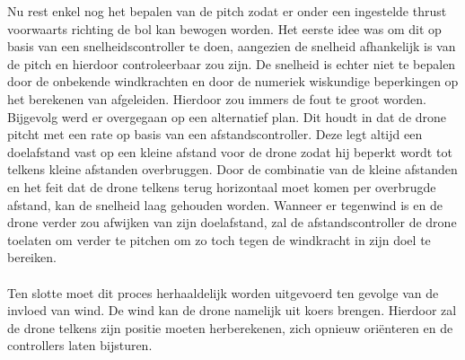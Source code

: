 Nu rest enkel nog het bepalen van de pitch zodat er onder een ingestelde thrust voorwaarts richting de bol kan bewogen worden. Het eerste idee was om dit op basis van een snelheidscontroller te doen, aangezien de snelheid afhankelijk is van de pitch en hierdoor controleerbaar zou zijn. De snelheid is echter niet te bepalen door de onbekende windkrachten en door de numeriek wiskundige beperkingen op het berekenen van afgeleiden. Hierdoor zou immers de fout te groot worden. Bijgevolg werd er overgegaan op een alternatief plan. Dit houdt in dat de drone pitcht met een rate op basis van een afstandscontroller. Deze legt altijd een doelafstand vast op een kleine afstand voor de drone zodat hij beperkt wordt tot telkens kleine afstanden overbruggen. Door de combinatie van de kleine afstanden en het feit dat de drone telkens terug horizontaal moet komen per overbrugde afstand, kan de snelheid laag gehouden worden. Wanneer er tegenwind is en de drone verder zou afwijken van zijn doelafstand, zal de afstandscontroller de drone toelaten om verder te pitchen om zo toch tegen de windkracht in zijn doel te bereiken.
\\
\\
Ten slotte moet dit proces herhaaldelijk worden uitgevoerd ten gevolge van de invloed van wind. De wind kan de drone namelijk uit koers brengen. Hierdoor zal de drone telkens zijn positie moeten herberekenen, zich opnieuw ori\"enteren en de controllers laten bijsturen.